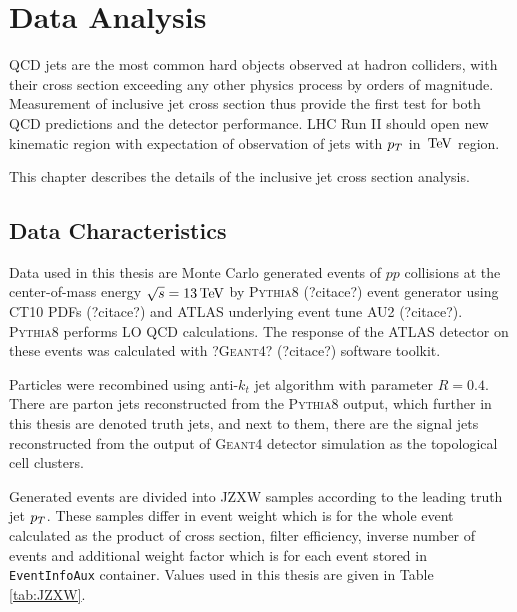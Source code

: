 \chapter{Data Analysis}


QCD jets are the most common hard objects observed at hadron colliders, with
their cross section exceeding any other physics process by orders of magnitude.
Measurement of inclusive jet cross section thus provide the first test for both
QCD predictions and the detector performance. LHC Run II should open new
kinematic region with expectation of observation of jets with $p_{T}$ in $\,\text{TeV}$
region.

This chapter describes the details of the inclusive jet cross section analysis.

\section{Data Characteristics}

Data used in this thesis are Monte Carlo generated events of $pp$ collisions at
the center-of-mass energy $\sqrt{s} = 13\,\text{TeV}$ by \textsc{Pythia8}
(?citace?) event generator using CT10 PDFs (?citace?) and ATLAS underlying event
tune AU2 (?citace?). \textsc{Pythia8} performs LO QCD calculations. The response of
the ATLAS detector on these events was calculated with ?\textsc{Geant4}?
(?citace?) software toolkit.

Particles were recombined using anti-$k_t$ jet algorithm with parameter $R=0.4$.
There are parton jets reconstructed from the \textsc{Pythia8} output, which
further in this thesis are denoted truth jets, and next to them, there are the
signal jets reconstructed from the output of \textsc{Geant4} detector
simulation as the topological cell clusters. 

Generated events are divided into JZXW samples according to
the leading truth jet $p_{T}$. These samples differ in event weight which is for
the whole event calculated as the product of cross section, filter efficiency,
inverse number of events and additional weight factor which is for each event
stored in \texttt{EventInfoAux} container. Values used in this thesis are given
in Table \ref{tab:JZXW}.  

